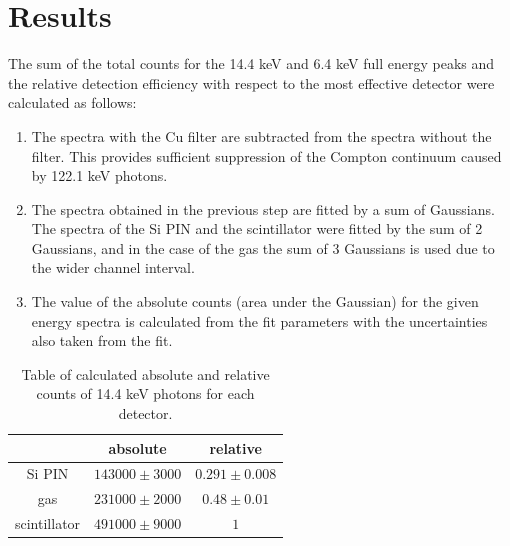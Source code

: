 \section{Results}
The sum of the total counts for the 14.4 keV and 6.4 keV full energy peaks and the relative detection efficiency with respect to the most effective detector were calculated as follows:
\begin{enumerate}
\item The spectra with the Cu filter are subtracted from the spectra without the filter. This provides sufficient suppression of the Compton continuum caused by 122.1 keV photons. 
\item The spectra obtained in the previous step are fitted by a sum of Gaussians. The spectra of the Si PIN and the scintillator were fitted by the sum of 2 Gaussians, and in the case of the gas the sum of 3 Gaussians is used due to the wider channel interval.
\item The value of the absolute counts (area under the Gaussian) for the given energy spectra is calculated from the fit parameters with the uncertainties also taken from the fit.
\end{enumerate}
\begin{table}[H]
\centering
\begin{tabular}{|c|c|c|}
\hline
   & absolute & relative \\ \hline
Si PIN & $143000 \pm 3000$    & $0.291 \pm 0.008$  \\ \hline
gas & $231000 \pm 2000$    & $0.48 \pm  0.01$ \\ \hline
scintillator  & $491000 \pm 9000$    & $1$ \\ \hline
\end{tabular}
\caption{Table of calculated absolute and relative counts of 14.4 keV photons for each detector.}
 \label{144kevEFF}
\end{table}


